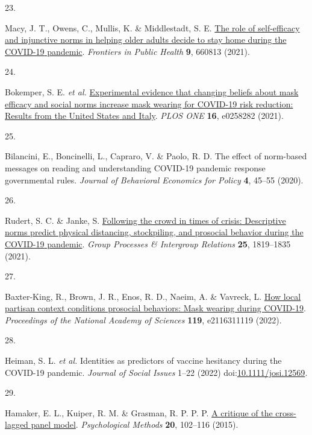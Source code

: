 \documentclass[
  man, donotrepeattitle,floatsintext]{apa6}
\newlength{\cslhangindent}
\newlength{\csllabelwidth}
\newlength{\cslentryspacingunit} %
\newenvironment{CSLReferences}[2] %
 {%
  \setlength{\parindent}{0pt}
  \ifodd #1
  \let\oldpar\par
  \def\par{\hangindent=\cslhangindent\oldpar}
  \fi
  \setlength{\parskip}{#2\cslentryspacingunit}
 }%
 {}
\newcommand{\CSLLeftMargin}[1]{\parbox[t]{\csllabelwidth}{#1}}
\newcommand{\CSLRightInline}[1]{\parbox[t]{\linewidth - \csllabelwidth}{#1}\break}
\begin{document}
\begin{CSLReferences}{0}{0}
\leavevmode{}%
\CSLLeftMargin{23. }%
\CSLRightInline{Macy, J. T., Owens, C., Mullis, K. \& Middlestadt, S. E. \href{https://doi.org/10.3389/fpubh.2021.660813}{The role of self-efficacy and injunctive norms in helping older adults decide to stay home during the {COVID-19} pandemic}. \emph{Frontiers in Public Health} \textbf{9}, 660813 (2021).}

\leavevmode{}%
\CSLLeftMargin{24. }%
\CSLRightInline{Bokemper, S. E. \emph{et al.} \href{https://doi.org/10.1371/journal.pone.0258282}{Experimental evidence that changing beliefs about mask efficacy and social norms increase mask wearing for {COVID-19} risk reduction: Results from the {United States} and {Italy}}. \emph{PLOS ONE} \textbf{16}, e0258282 (2021).}

\leavevmode{}%
\CSLLeftMargin{25. }%
\CSLRightInline{Bilancini, E., Boncinelli, L., Capraro, V. \& Paolo, R. D. The effect of norm-based messages on reading and understanding COVID-19 pandemic response governmental rules. \emph{Journal of Behavioral Economics for Policy} \textbf{4}, 45--55 (2020).}

\leavevmode{}%
\CSLLeftMargin{26. }%
\CSLRightInline{Rudert, S. C. \& Janke, S. \href{https://doi.org/10.1177/13684302211023562}{Following the crowd in times of crisis: Descriptive norms predict physical distancing, stockpiling, and prosocial behavior during the {COVID-19} pandemic}. \emph{Group Processes \& Intergroup Relations} \textbf{25}, 1819--1835 (2021).}

\leavevmode{}%
\CSLLeftMargin{27. }%
\CSLRightInline{Baxter-King, R., Brown, J. R., Enos, R. D., Naeim, A. \& Vavreck, L. \href{https://doi.org/10.1073/pnas.2116311119}{How local partisan context conditions prosocial behaviors: Mask wearing during {COVID-19}}. \emph{Proceedings of the National Academy of Sciences} \textbf{119}, e2116311119 (2022).}

\leavevmode{}%
\CSLLeftMargin{28. }%
\CSLRightInline{Heiman, S. L. \emph{et al.} Identities as predictors of vaccine hesitancy during the COVID-19 pandemic. \emph{Journal of Social Issues} 1--22 (2022) doi:\href{https://doi.org/10.1111/josi.12569}{10.1111/josi.12569}.}

\leavevmode{}%
\CSLLeftMargin{29. }%
\CSLRightInline{Hamaker, E. L., Kuiper, R. M. \& Grasman, R. P. P. P. \href{https://doi.org/10.1037/a0038889}{A critique of the cross-lagged panel model}. \emph{Psychological Methods} \textbf{20}, 102--116 (2015).}


\end{CSLReferences}
\end{document}
